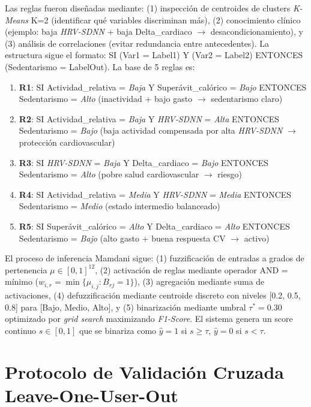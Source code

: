 Las reglas fueron diseñadas mediante: (1) inspección de centroides de clusters \textit{K-Means} K=2 (identificar qué variables discriminan más), (2) conocimiento clínico (ejemplo: baja \textit{HRV-SDNN} + baja Delta\_cardiaco $\to$ desacondicionamiento), y (3) análisis de correlaciones (evitar redundancia entre antecedentes). La estructura sigue el formato: SI (Var1 = Label1) Y (Var2 = Label2) ENTONCES (Sedentarismo = LabelOut). La base de 5 reglas es:

\begin{enumerate}
    \item \textbf{R1}: SI Actividad\_relativa = \textit{Baja} Y Superávit\_calórico = \textit{Bajo} ENTONCES Sedentarismo = \textit{Alto} (inactividad + bajo gasto $\to$ sedentarismo claro)
    \item \textbf{R2}: SI Actividad\_relativa = \textit{Baja} Y \textit{HRV-SDNN} = \textit{Alta} ENTONCES Sedentarismo = \textit{Bajo} (baja actividad compensada por alta \textit{HRV-SDNN} $\to$ protección cardiovascular)
    \item \textbf{R3}: SI \textit{HRV-SDNN} = \textit{Baja} Y Delta\_cardiaco = \textit{Bajo} ENTONCES Sedentarismo = \textit{Alto} (pobre salud cardiovascular $\to$ riesgo)
    \item \textbf{R4}: SI Actividad\_relativa = \textit{Media} Y \textit{HRV-SDNN} = \textit{Media} ENTONCES Sedentarismo = \textit{Medio} (estado intermedio balanceado)
    \item \textbf{R5}: SI Superávit\_calórico = \textit{Alto} Y Delta\_cardiaco = \textit{Alto} ENTONCES Sedentarismo = \textit{Bajo} (alto gasto + buena respuesta CV $\to$ activo)
\end{enumerate}

El proceso de inferencia Mamdani sigue: (1) fuzzificación de entradas a grados de pertenencia $\mu \in [0,1]^{12}$, (2) activación de reglas mediante operador AND = mínimo ($w_{i,r} = \min\{\mu_{i,j} : B_{rj} = 1\}$), (3) agregación mediante suma de activaciones, (4) defuzzificación mediante centroide discreto con niveles [0.2, 0.5, 0.8] para [Bajo, Medio, Alto], y (5) binarización mediante umbral $\tau^* = 0.30$ optimizado por \textit{grid search} maximizando \textit{F1-Score}. El sistema genera un score continuo $s \in [0,1]$ que se binariza como $\hat{y} = 1$ si $s \geq \tau$, $\hat{y} = 0$ si $s < \tau$.

\section{Protocolo de Validación Cruzada Leave-One-User-Out}
\label{sec:validacion_louo}

